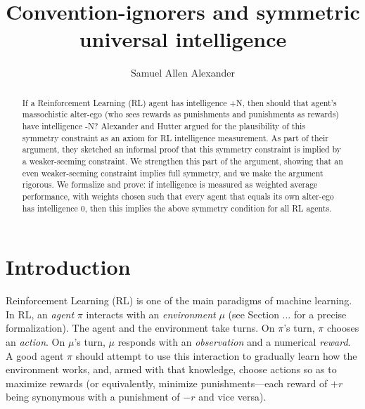 \documentclass[runningheads]{llncs}
\begin{document}
\title{Convention-ignorers and symmetric universal intelligence}
\author{Samuel Allen
Alexander}


\maketitle

\begin{abstract}
    If a Reinforcement Learning (RL) agent has intelligence +N, then should
    that agent's massochistic alter-ego (who sees rewards as punishments and
    punishments as rewards) have intelligence -N? Alexander and Hutter argued for
    the plausibility of this symmetry constraint as an axiom for RL
    intelligence measurement. As part of their argument, they sketched an
    informal proof that this symmetry constraint is implied by a weaker-seeming
    constraint. We strengthen this part of the argument, showing that an even
    weaker-seeming constraint implies full symmetry, and we make the argument
    rigorous. We formalize and prove: if intelligence is measured
    as weighted average performance, with weights chosen such that every agent
    that equals its own alter-ego has intelligence $0$, then this implies the
    above symmetry condition for all RL agents.
\end{abstract}

\section{Introduction}

Reinforcement Learning (RL) is one of the main paradigms of machine learning.
In RL, an \emph{agent} $\pi$ interacts with an \emph{environment} $\mu$ (see Section ... for
a precise formalization). The agent and the environment take turns. On $\pi$'s
turn, $\pi$ chooses an \emph{action}. On $\mu$'s turn, $\mu$
responds with an \emph{observation} and a numerical \emph{reward}. A good agent $\pi$
should attempt to use this interaction to gradually learn how the environment works,
and, armed with that
knowledge, choose actions so as to maximize rewards (or equivalently, minimize
punishments---each reward of $+r$ being synonymous with a punishment of $-r$ and
vice versa).
\end{document}
